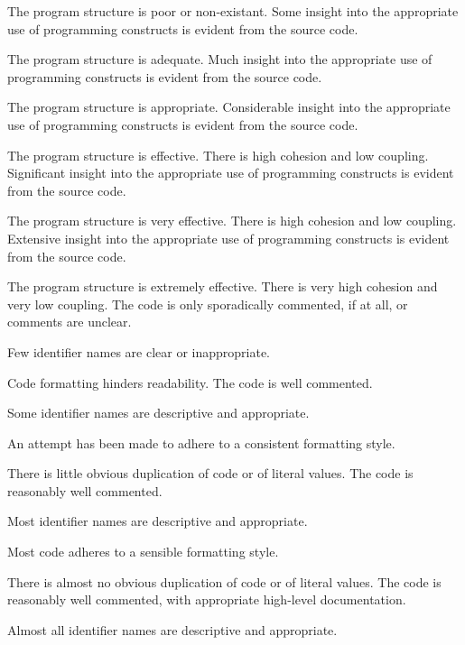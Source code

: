 \begin{markingrubric}
            \par The program structure is poor or non-existant.
        \grade Some insight into the appropriate use of programming constructs is evident from the source code.
            \par The program structure is adequate.
        \grade Much insight into the appropriate use of programming constructs is evident from the source code.
            \par The program structure is appropriate.
        \grade Considerable insight into the appropriate use of programming constructs is evident from the source code.
            \par The program structure is effective. There is high cohesion and low coupling.
        \grade Significant insight into the appropriate use of programming constructs is evident from the source code.
            \par The program structure is very effective. There is high cohesion and low coupling.
        \grade Extensive insight into the appropriate use of programming constructs is evident from the source code.
            \par The program structure is extremely effective. There is very high cohesion and very low coupling.
%
        \grade \fail The code is only sporadically commented, if at all, or comments are unclear.
            \par Few identifier names are clear or inappropriate.
            \par Code formatting hinders readability.
        \grade The code is well commented.
            \par Some identifier names are descriptive and appropriate.
            \par An attempt has been made to adhere to a consistent formatting style.
             \par There is little obvious duplication of code or of literal values.           
        \grade The code is reasonably well commented.
            \par Most identifier names are descriptive and appropriate.
            \par Most code adheres to a sensible formatting style.
             \par There is almost no obvious duplication of code or of literal values.   
        \grade The code is reasonably well commented, with appropriate high-level documentation.
            \par Almost all identifier names are descriptive and appropriate.

\end{markingrubric}
